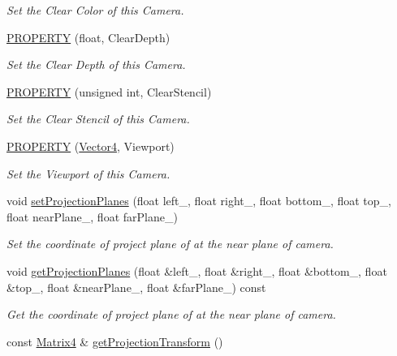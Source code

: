 \begin{DoxyCompactItemize}
\begin{DoxyCompactList}\small\item\em Set the Clear Color of this Camera. \end{DoxyCompactList}\item 
\hyperlink{class_i_dream_sky_1_1_camera_component_ad3d2a0d318c6e4e9b695349b935e6be7}{P\+R\+O\+P\+E\+R\+TY} (float, Clear\+Depth)
\begin{DoxyCompactList}\small\item\em Set the Clear Depth of this Camera. \end{DoxyCompactList}\item 
\hyperlink{class_i_dream_sky_1_1_camera_component_ad7ea7ab816ff20c21855fef0ced97e12}{P\+R\+O\+P\+E\+R\+TY} (unsigned int, Clear\+Stencil)
\begin{DoxyCompactList}\small\item\em Set the Clear Stencil of this Camera. \end{DoxyCompactList}\item 
\hyperlink{class_i_dream_sky_1_1_camera_component_abca9ce5b34ac81afcf615fd919ac32fa}{P\+R\+O\+P\+E\+R\+TY} (\hyperlink{class_i_dream_sky_1_1_vector4}{Vector4}, Viewport)
\begin{DoxyCompactList}\small\item\em Set the Viewport of this Camera. \end{DoxyCompactList}\item 
void \hyperlink{class_i_dream_sky_1_1_camera_component_ab50fcc345c5beb14317b4bb74f6c2b2e}{set\+Projection\+Planes} (float left\+\_\+, float right\+\_\+, float bottom\+\_\+, float top\+\_\+, float near\+Plane\+\_\+, float far\+Plane\+\_\+)
\begin{DoxyCompactList}\small\item\em Set the coordinate of project plane of at the near plane of camera. \end{DoxyCompactList}\item 
void \hyperlink{class_i_dream_sky_1_1_camera_component_af5d94dcadd4011e3a0dad972c8eadd9b}{get\+Projection\+Planes} (float \&left\+\_\+, float \&right\+\_\+, float \&bottom\+\_\+, float \&top\+\_\+, float \&near\+Plane\+\_\+, float \&far\+Plane\+\_\+) const 
\begin{DoxyCompactList}\small\item\em Get the coordinate of project plane of at the near plane of camera. \end{DoxyCompactList}\item 
const \hyperlink{class_i_dream_sky_1_1_matrix4}{Matrix4} \& \hyperlink{class_i_dream_sky_1_1_camera_component_aa7d6a7f6379dc17af5eec17fd91843af}{get\+Projection\+Transform} ()

\end{DoxyCompactItemize}
